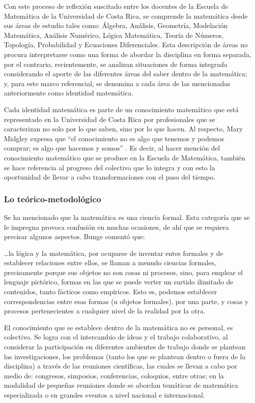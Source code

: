 Con este proceso de reflexión suscitado entre los docentes de la Escuela de Matemática de la Universidad de Costa Rica, se comprende la matemática desde sus áreas de estudio tales como: Álgebra, Análisis, Geometría, Modelación Matemática, Análisis Numérico, Lógica Matemática, Teoría de Números, Topología, Probabilidad y Ecuaciones Diferenciales.   Esta descripción de áreas no procura interpretarse como una forma de abordar la disciplina en forma separada, por el contrario, recientemente, se analizan situaciones de forma integrada considerando el aporte de las diferentes áreas del saber dentro de la matemática; y, para este marco referencial, se denomina a cada área de las mencionadas anteriormente como identidad matemática.

Cada identidad matemática es parte de un conocimiento matemático que está representado en la Universidad de Costa Rica por profesionales que se caracterizan no solo por lo que saben, sino por lo que hacen. Al respecto, Mary Midgley expresa que “el conocimiento no es algo que tenemos y podemos comprar; es algo que hacemos y somos” \cite{Midgley2002}. Es decir, al hacer mención del conocimiento matemático que se produce en la Escuela de Matemática, también se hace referencia al progreso del colectivo que lo integra y con esto la oportunidad de llevar a cabo transformaciones con el paso del tiempo.



\subsubsection{Lo teórico-metodológico}

Se ha mencionado que la matemática es una ciencia formal. Esta categoría que se le impregna provoca confusión en muchas ocasiones, de ahí que se requiera precisar algunos aspectos. Bunge \cite{Bunge1960} comentó que: 

…la lógica y la matemática, por ocuparse de inventar entes formales y de establecer relaciones entre ellos, se llaman a menudo ciencias formales, precisamente porque sus objetos no son cosas ni procesos, sino, para emplear el lenguaje pictórico, formas en las que se puede verter un surtido ilimitado de contenidos, tanto fácticos como empíricos. Esto es, podemos establecer correspondencias entre esas formas (u objetos formales), por una parte, y cosas y procesos pertenecientes a cualquier nivel de la realidad por la otra.

El conocimiento que se establece dentro de la matemática no es personal, es colectivo. Se logra con el intercambio de ideas y el trabajo colaborativo, al considerar la participación en diferentes ambientes de trabajo donde se plantean las investigaciones, los problemas (tanto los que se plantean dentro o fuera de la disciplina) a través de las reuniones científicas, las cuales se llevan a cabo por medio de: congresos, simposios, conferencias, coloquios, entre otras; en la modalidad de pequeñas reuniones donde se abordan temáticas de matemática especializada o en grandes eventos a nivel nacional e internacional.  

